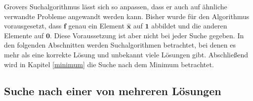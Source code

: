 Grovers Suchalgorithmus lässt sich so anpassen, dass er auch auf ähnliche verwandte Probleme angewandt werden kann.
Bisher wurde für den Algorithmus vorausgesetzt, dass $\mathbf{f}$ genau ein Element $\mathbf{\hat x}$ auf $\mathbf{1}$ abbildet und die anderen Elemente auf $\mathbf{0}$. 
Diese Voraussetzung ist aber nicht bei jeder Suche gegeben. In den folgenden Abschnitten werden Suchalgorithmen betrachtet, bei denen es mehr als eine korrekte Lösung und unbekannt viele Lösungen gibt. 
Abschließend wird in Kapitel \ref{minimum} die Suche nach dem Minimum betrachtet. 

\subsection{Suche nach einer von mehreren Lösungen}

